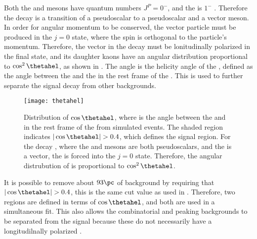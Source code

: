 

Both the \Bp and \Ds mesons have quantum numbers $J^P=0^-$, and the \phii is $1^-$ .
Therefore the decay \btodsphi is a transition of a pseudoscalar to a pseudoscalar and a vector
meson.
In order for angular momentum to be conserved, the vector particle must be produced in the $j=0$
state, where the spin is orthogonal to the particle's momentum.
Therefore, the vector \phii in the decay \btodsphi must be lonitudinally polarized in the final
state, and its daughter kaons have an angular distribution proportional to $\cos^2\thetahel$, as
shown in .
The angle \thetahel is the helicity angle of the \phii, defined as the angle between the \Kp and
the \Bp in the rest frame of the \phii.
This is used to further separate the signal decay \btodsphi from other backgrounds.

\begin{figure}
  \begin{center}
    \texttt{[image: thetahel]}
    \caption{\small
      Distribution of $\cos\thetahel$, where \thetahel is the angle between the \Bp and \Kp in the
      rest frame of the \phii from simulated events.
      The shaded region indicates $|\cos\thetahel|>0.4$, which defines the signal region.
      For the decay \btodsphi, where the \Bp and \Ds mesons are both pseudoscalars, and the
      \phii is a vector, the \phii is forced into the $j=0$ state.
      Therefore, the angular distrubution of \thetahel is proportional to $\cos^2\thetahel$.
    }
    \label{fig:dsphi:hel}
  \end{center}
\end{figure}

It is possible to remove about $93\pc$ of background by requiring that $|\cos\thetahel|>0.4$,
this is the same cut value as used in .
Therefore, two regions are defined in terms of $\cos\thetahel$, and both are used in a simultaneous
fit.
This also allows the combinatorial and peaking backgrounds to be separated from the signal because
these do not necessarily have a longitudilnally polarized \phii.


